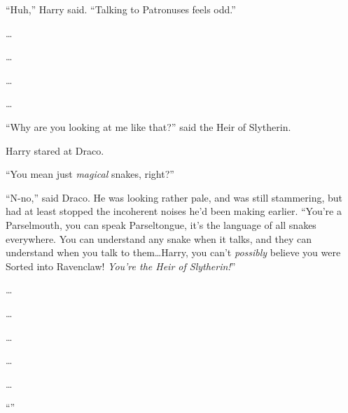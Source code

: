 “Huh,” Harry said. “Talking to Patronuses feels odd.”

…

…

…

…

“Why are you looking at me like that?” said the Heir of Slytherin.


Harry stared at Draco.

“You mean just \emph{magical} snakes, right?”

“N-no,” said Draco. He was looking rather pale, and was still stammering, but had at least stopped the incoherent noises he’d been making earlier. “You’re a Parselmouth, you can speak Parseltongue, it’s the language of all snakes everywhere. You can understand any snake when it talks, and they can understand when you talk to them…Harry, you can’t \emph{possibly} believe you were Sorted into Ravenclaw! \emph{You’re the Heir of Slytherin!}”

…

…

…

…

…

“”

